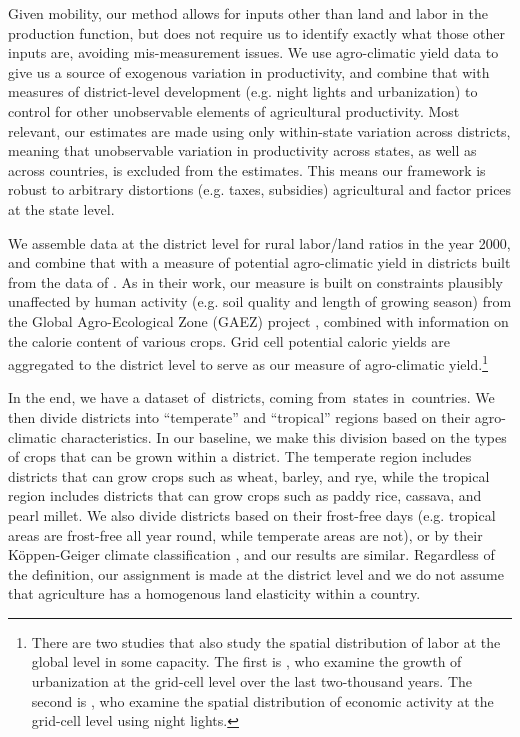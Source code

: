 \documentclass[11pt]{article}
\begin{document}
Given mobility, our method allows for inputs other than land and labor in the production function, but does not require us to identify exactly what those other inputs are, avoiding mis-measurement issues. We use agro-climatic yield data to give us a source of exogenous variation in productivity, and combine that with measures of district-level development (e.g. night lights and urbanization) to control for other unobservable elements of agricultural productivity. Most relevant, our estimates are made using only within-state variation across districts, meaning that unobservable variation in productivity across states, as well as across countries, is excluded from the estimates. This means our framework is robust to arbitrary distortions (e.g. taxes, subsidies) agricultural and factor prices at the state level.

We assemble data at the district level for rural labor/land ratios in the year 2000, and combine that with a measure of potential agro-climatic yield in districts built from the data of \citet{galorozak2016}. As in their work, our measure is built on constraints plausibly unaffected by human activity (e.g. soil quality and length of growing season) from the Global Agro-Ecological Zone (GAEZ) project \citep{gaez}, combined with information on the calorie content of various crops. Grid cell potential caloric yields are aggregated to the district level to serve as our measure of agro-climatic yield.\footnote{There are two studies that also study the spatial distribution of labor at the global level in some capacity. The first is \citet{mfm2014}, who examine the growth of urbanization at the grid-cell level over the last two-thousand years. The second is \citet{hssw2016}, who examine the spatial distribution of economic activity at the grid-cell level using night lights.}

In the end, we have a dataset of\districts \ districts, coming from\provinces \ states in\countries \ countries. We then divide districts into ``temperate'' and ``tropical'' regions based on their agro-climatic characteristics. In our baseline, we make this division based on the types of crops that can be grown within a district. The temperate region includes districts that can grow crops such as wheat, barley, and rye, while the tropical region includes districts that can grow crops such as paddy rice, cassava, and pearl millet. We also divide districts based on their frost-free days (e.g. tropical areas are frost-free all year round, while temperate areas are not), or by their K{\"o}ppen-Geiger climate classification \citep{kottek2006}, and our results are similar. Regardless of the definition, our assignment is made at the district level and we do not assume that agriculture has a homogenous land elasticity within a country. 
\end{document}
